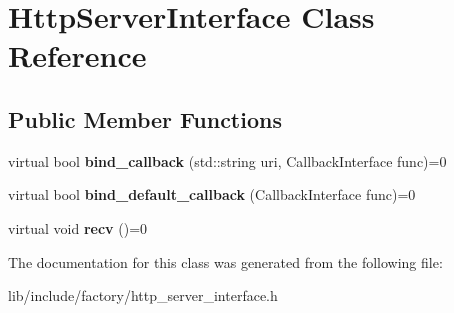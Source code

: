 \hypertarget{classHttpServerInterface}{\section{Http\-Server\-Interface Class Reference}
\label{classHttpServerInterface}
}
\subsection*{Public Member Functions}
\begin{DoxyCompactItemize}
\item 
\hypertarget{classHttpServerInterface_a6aa54efaf6f176d985c7faa57e1aa7fd}{virtual bool {\bfseries bind\-\_\-callback} (std\-::string uri, Callback\-Interface func)=0}\label{classHttpServerInterface_a6aa54efaf6f176d985c7faa57e1aa7fd}

\item 
\hypertarget{classHttpServerInterface_a398064a0d7fb0c7e52d94ccfcbb6d89a}{virtual bool {\bfseries bind\-\_\-default\-\_\-callback} (Callback\-Interface func)=0}\label{classHttpServerInterface_a398064a0d7fb0c7e52d94ccfcbb6d89a}

\item 
\hypertarget{classHttpServerInterface_a350f4321505079d9c440ce4a4372044f}{virtual void {\bfseries recv} ()=0}\label{classHttpServerInterface_a350f4321505079d9c440ce4a4372044f}

\end{DoxyCompactItemize}


The documentation for this class was generated from the following file\-:\begin{DoxyCompactItemize}
\item 
lib/include/factory/http\-\_\-server\-\_\-interface.\-h\end{DoxyCompactItemize}

